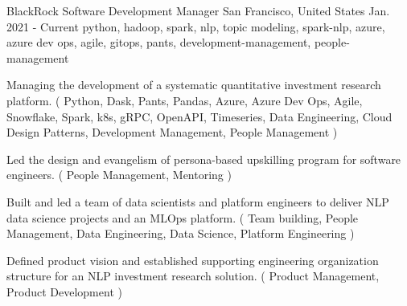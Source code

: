 \cventry
    {BlackRock} %
    {Software Development Manager} %
    {San Francisco, United States} %
    {Jan. 2021 - Current} %
    { python, hadoop, spark, nlp, topic modeling, spark-nlp, azure, azure dev ops, agile, gitops, pants, development-management, people-management} %
    {
    \begin{cvitems} %
       \item { Managing the development of a systematic quantitative investment research platform. ( Python, Dask, Pants, Pandas, Azure, Azure Dev Ops, Agile, Snowflake, Spark, k8s, gRPC, OpenAPI, Timeseries, Data Engineering, Cloud Design Patterns, Development Management, People Management ) }
       \item { Led the design and evangelism of persona-based upskilling program for software engineers. ( People Management, Mentoring ) }
       \item { Built and led a team of data scientists and platform engineers to deliver NLP data science projects and an MLOps platform. ( Team building, People Management, Data Engineering, Data Science, Platform Engineering ) }
       \item { Defined product vision and established supporting engineering organization structure for an NLP investment research solution. ( Product Management, Product Development ) }
    \end{cvitems}
    }
